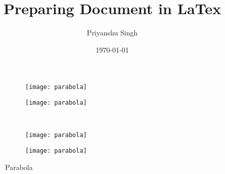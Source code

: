\documentclass[10pt,twocolumn]{article}
\begin{document}
	\title{Preparing Document in LaTex}
	\author{Priyanshu Singh}
	\date{\today}
	\maketitle
	\blindtext
	\begin{figure}[h]
		\centering
		\begin{subfigure}{0.2\textwidth}
			\texttt{[image: parabola]}
		\end{subfigure}
		\begin{subfigure}{0.2\textwidth}
			\texttt{[image: parabola]}
		\end{subfigure}\\
		\begin{subfigure}{0.2\textwidth}
			\texttt{[image: parabola]}
		\end{subfigure}
		\begin{subfigure}{0.2\textwidth}
			\texttt{[image: parabola]}
		\end{subfigure}
		\caption{Parabola}
	\end{figure}
	\blindtext[3]
	\lipsum
\end{document}
